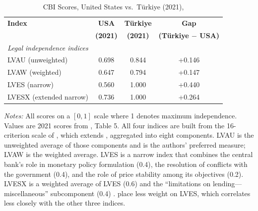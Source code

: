 \documentclass[12pt,a4paper]{article}
\begin{document}
\begin{doublespace}
\begin{singlespace}
\begin{table}[H]
\centering
\caption{CBI Scores, United States vs.\ T\"urkiye (2021), \textcite{dincer_central_2024}}
\label{tab:dincer_cbi}
\begin{tabular}{lccc}
\toprule
\textbf{Index} & \textbf{USA} & \textbf{T\"urkiye} & \textbf{Gap} \\
 & \textbf{(2021)} & \textbf{(2021)} & \textbf{(T\"urkiye $-$ USA)} \\
\midrule
\multicolumn{4}{l}{\textit{Legal independence indices}} \\
\quad LVAU (unweighted) & 0.698 & 0.844 & +0.146 \\
\quad LVAW (weighted) & 0.647 & 0.794 & +0.147 \\
\quad LVES (narrow) & 0.560 & 1.000 & +0.440 \\
\quad LVESX (extended narrow) & 0.736 & 1.000 & +0.264 \\
\bottomrule
\end{tabular}
\smallskip
\begin{minipage}{\linewidth}
\footnotesize\textit{Notes:} All scores on a $[0,1]$ scale where 1 denotes maximum independence. Values are 2021 scores from \textcite{dincer_central_2024}, Table 5. All four indices are built from the 16-criterion scale of \textcite{cukierman_central_2002}, which extends \textcite{cukierman_measuring_1992}, aggregated into eight components. LVAU is the unweighted average of those components and is the authors' preferred measure; LVAW is the weighted average. LVES is a narrow index that combines the central bank's role in monetary policy formulation (0.4), the resolution of conflicts with the government (0.4), and the role of price stability among its objectives (0.2). LVESX is a weighted average of LVES (0.6) and the ``limitations on lending---miscellaneous'' subcomponent (0.4) \parencite[407]{dincer_central_2024}. \textcite[405]{dincer_central_2024} place less weight on LVES, which correlates less closely with the other three indices.
\end{minipage}
\end{table}
\end{singlespace}



\end{doublespace}
\end{document}
